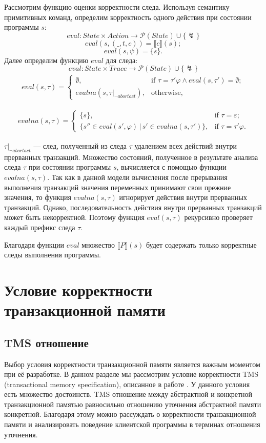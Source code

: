 Рассмотрим функцию оценки корректности следа. Используя семантику примитивных команд, определим корректность одного действия при состоянии программы $s$:
$$eval: State \times Action \to \mathcal{P}(State) \cup \{ \lightning\} $$
$$eval(s,(\_,t,c)) = \llbracket c\rrbracket (s);$$
$$eval(s,\psi) = \{s\}.$$
Далее определим функцию $eval$ для следа:
$$eval: State \times Trace \to \mathcal{P}(State) \cup \{ \lightning\} $$
\begin{align*}
  eval(s,\tau)=\begin{cases}
    \emptyset, & \text{if $\tau = \tau'\varphi \land eval(s, \tau') = \emptyset$};\\
    evalna(s, \tau |_{\neg abortact}), & \text{otherwise},
  \end{cases}
\end{align*}

\begin{align*}
     evalna(s,\tau)=\begin{cases}
    \{s\}, & \text{if $\tau =  \varepsilon$};\\ 
     \{s'' \in eval(s', \varphi) \, | \, s' \in  evalna(s, \tau') \}, & \text{if $\tau = \tau'\varphi$}.
   \end{cases}
  \end{align*}

$\tau |_{\neg abortact}$ --- след, полученный из следа $\tau$ удалением всех действий внутри прерванных транзакций. Множество состояний, полученное в результате анализа следа $\tau$ при состоянии программы $s$, вычисляется с помощью функции $evalna(s, \tau)$. Так как в данной модели вычисления после прерывания выполнения транзакций значения переменных принимают свои прежние значения, то функция $evalna(s, \tau)$ игнорирует действия внутри прерванных транзакций. Однако, последовательность действия внутри прерванных транзакций может быть некорректной. Поэтому функция $eval(s,\tau)$ рекурсивно проверяет каждый префикс следа $\tau$.

Благодаря функции $eval$ множество $\llbracket P \rrbracket(s)$ будет содержать только корректные следы выполнения программы.

\chapter{Условие корректности транзакционной памяти}
\section{TMS отношение}
Выбор условия корректности транзакционной памяти является важным моментом при её разработке. В данном разделе мы рассмотрим условие корректности TMS (transactional memory specification), описанное в работе \cite{tms_article}. У данного условия есть множество достоинств. TMS отношение между абстрактной и конкретной транзакционной памятью равносильно отношению уточнения абстрактной памяти конкретной. Благодаря этому можно рассуждать о корректности транзакционной памяти и анализировать поведение клиентской программы в терминах отношения уточнения.

